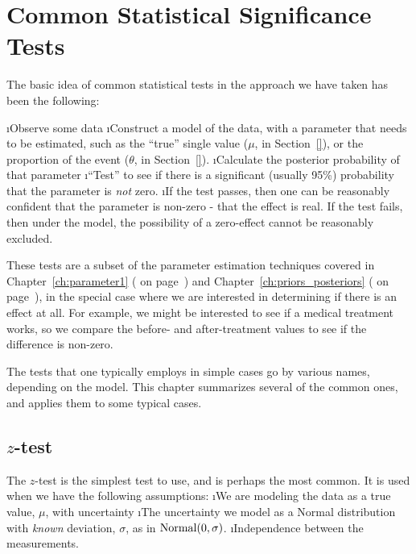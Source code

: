 
\chapter{Common Statistical Significance Tests}\label{ch:tests}

The basic idea of common statistical tests in the approach we have taken has been the following:

\be
\i Observe some data
\i Construct a model of the data, with a parameter that needs to be estimated, such as the ``true'' single value ($\mu$, in Section~\ref{}), or the proportion of the event ($\theta$, in Section~\ref{}).  
\i Calculate the posterior probability of that parameter
\i ``Test'' to see if there is a significant (usually 95\%) probability that the parameter is {\em not} zero.
\i If the test passes, then one can be reasonably confident that the parameter is non-zero - that the effect is real.  If the test fails, then under the model, the possibility of a zero-effect cannot be reasonably excluded.
\ee

These tests are a subset of the parameter estimation techniques covered in Chapter~\ref{ch:parameter1} (\emph{} on page~\pageref{ch:parameter1}) and Chapter~\ref{ch:priors_posteriors} (\emph{} on page~\pageref{ch:priors_posteriors}), in the special case where we are interested in determining if there is an effect at all.  For example, we might be interested to see if a medical treatment works, so we compare the before- and after-treatment values to see if the difference is non-zero. 

The tests that one typically employs in simple cases go by various names, depending on the model.  This chapter summarizes several of the common ones, and applies them to some typical cases.

\section{$z$-test}\label{sec:ztest}

The $z$-test is the simplest test to use, and is perhaps the most common.  It is used when we have the following assumptions:
\be
\i We are modeling the data as a true value, $\mu$, with uncertainty 
\i The uncertainty we model as a Normal distribution with \emph{known} deviation, $\sigma$, as in ${\rm Normal}(0,\sigma)$.
\i Independence between the measurements.
\ee

